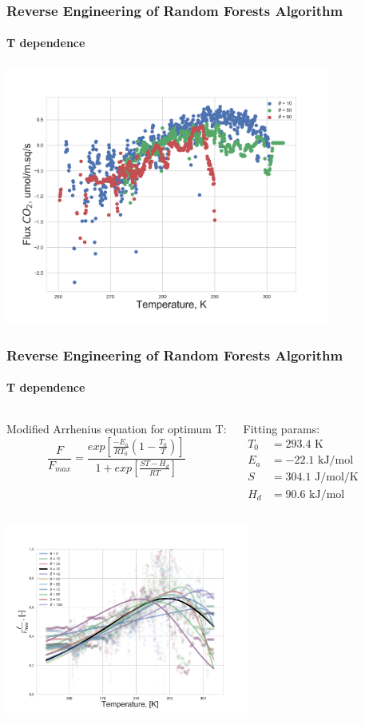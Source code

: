 \documentclass{beamer}
\begin{document}
\begin{frame}
\frametitle{Reverse Engineering of Random Forests Algorithm}
\framesubtitle{T dependence}
\centering
\includegraphics[width=0.8\textwidth]{T_dependence.png}\\
\end{frame}


\begin{frame}
\frametitle{Reverse Engineering of Random Forests Algorithm}
\framesubtitle{T dependence}

\begin{columns}[t]
\tiny
{}
\centering
Modified Arrhenius equation for optimum T:
\begin{equation}
    \frac{F}{F_{max}} = \frac{exp\left[\frac{-E_a}{RT_0}\left(1 - \frac{T_0}{T} \right)\right]}{1 + exp\left[ \frac{S T - H_d}{RT} \right]}
\end{equation}

\tiny
\centering
Fitting params:
\begin{align}
T_0 &= 293.4 \text{ K} \\
E_a &= - 22.1 \text{ kJ/mol} \\
S &= 304.1 \text{ J/mol/K} \\
H_d &= 90.6 \text{ kJ/mol}
\end{align}


\end{columns}
\centering
\includegraphics[width=0.6\textwidth]{T_dependence_all.png}
\end{frame}
\end{document}
